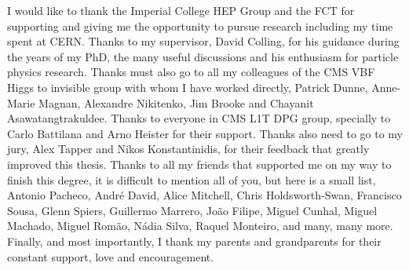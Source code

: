 
\begin{acknowledgements}
I would like to thank the Imperial College HEP Group and the FCT for supporting and giving me the opportunity to pursue research including my time spent at CERN. Thanks to my supervisor, David Colling, for his guidance during the years of my PhD, the many useful discussions and his enthusiasm for particle physics research. Thanks must also go to all my colleagues of the CMS VBF Higgs to invisible group with whom I have worked directly, Patrick Dunne, Anne-Marie Magnan, Alexandre Nikitenko, Jim Brooke and Chayanit Asawatangtrakuldee. Thanks to everyone in CMS L1T DPG group, specially to Carlo Battilana and Arno Heister for their support. Thanks also need to go to my jury, Alex Tapper and Nikos Konstantinidis, for their feedback that greatly improved this thesis. Thanks to all my friends that supported me on my way to finish this degree, it is difficult to mention all of you, but here is a small list, Antonio Pacheco, André David, Alice Mitchell, Chris Holdsworth-Swan, Francisco Sousa, Glenn Spiers, Guillermo Marrero, João Filipe, Miguel Cunhal, Miguel Machado, Miguel Romão, Nádia Silva, Raquel Monteiro, and many, many more. Finally, and most importantly, I thank my parents and grandparents for their constant support, love and encouragement.
\end{acknowledgements}




\dedication{To my grandmother.}


\tableofcontents

\newpage
\listoftables

\newpage
\listoffigures


 
